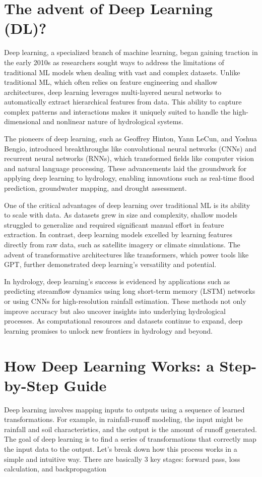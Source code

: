 \section{The advent of Deep Learning (DL)?}
Deep learning, a specialized branch of machine learning, began gaining traction in the early 2010s as researchers sought ways to address the limitations of traditional ML models when dealing with vast and complex datasets. Unlike traditional ML, which often relies on feature engineering and shallow architectures, deep learning leverages multi-layered neural networks to automatically extract hierarchical features from data. This ability to capture complex patterns and interactions makes it uniquely suited to handle the high-dimensional and nonlinear nature of hydrological systems.

The pioneers of deep learning, such as Geoffrey Hinton, Yann LeCun, and Yoshua Bengio, introduced breakthroughs like convolutional neural networks (CNNs) and recurrent neural networks (RNNs), which transformed fields like computer vision and natural language processing. These advancements laid the groundwork for applying deep learning to hydrology, enabling innovations such as real-time flood prediction, groundwater mapping, and drought assessment.

One of the critical advantages of deep learning over traditional ML is its ability to scale with data. As datasets grew in size and complexity, shallow models struggled to generalize and required significant manual effort in feature extraction. In contrast, deep learning models excelled by learning features directly from raw data, such as satellite imagery or climate simulations. The advent of transformative architectures like transformers, which power tools like GPT, further demonstrated deep learning’s versatility and potential.

In hydrology, deep learning’s success is evidenced by applications such as predicting streamflow dynamics using long short-term memory (LSTM) networks or using CNNs for high-resolution rainfall estimation. These methods not only improve accuracy but also uncover insights into underlying hydrological processes. As computational resources and datasets continue to expand, deep learning promises to unlock new frontiers in hydrology and beyond.

\section{How Deep Learning Works: a Step-by-Step Guide}
Deep learning involves mapping inputs to outputs using a sequence of learned transformations. For example, in rainfall-runoff modeling, the input might be rainfall and soil characteristics, and the output is the amount of runoff generated. The goal of deep learning is to find a series of transformations that correctly map the input data to the output. Let’s break down how this process works in a simple and intuitive way. There are basically 3 key stages: forward pass, loss calculation, and backpropagation
